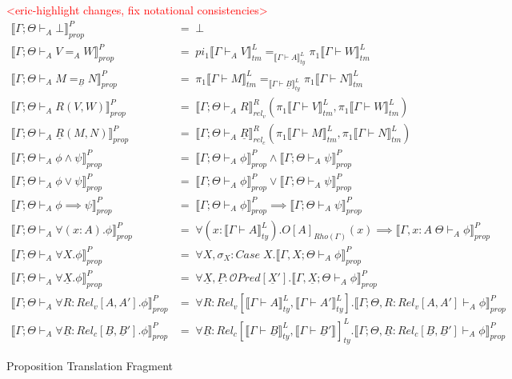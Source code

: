 \documentclass[acmsmall]{acmart}
\newcommand{\den}[1]{\llbracket #1\rrbracket}
\newcommand{\eric}[1]{\textcolor{red}{ <eric-#1> }}
\begin{document}
\begin{figure}
  \centering
  \scriptsize
  \eric{highlight changes, fix notational consistencies}
  \begin{align*}
    \den{\Gamma;\Theta\vdash_A \bot}^P_{prop}  &=\; \bot \\
    \den{\Gamma;\Theta\vdash_A V =_A W}^P_{prop} &=\; pi_1\den{\Gamma \vdash _AV}^L_{tm} =_{\den{\Gamma \vdash A}^L_{ty}} \pi_1 \den{\Gamma \vdash W}^L_{tm} \\
    \den{\Gamma;\Theta\vdash_A M =_{\underline{B}} N}^P_{prop} &=\;    \pi_1 \den{\Gamma \vdash M}^L_{tm} =_{\den{\Gamma \vdash \underline{B}}^L_{ty}}  \pi_1 \den{\Gamma  \vdash N}^L_{tm} \\
    \den{\Gamma;\Theta\vdash_A R(V,W)}^P_{prop} &=\;   \den{\Gamma ;\Theta\vdash _AR}^R_{rel_v}( \pi_1 \den{\Gamma \vdash V}^L_{tm},  \pi_1 \den{\Gamma \vdash W}^L_{tm}) \\
    \den{\Gamma;\Theta\vdash_A \underline{R}(M,N)}^P_{prop} &=\;   \den{\Gamma ; \Theta\vdash_A\underline{R}}^R_{rel_c}( \pi_1 \den{\Gamma \vdash M}^L_{tm},  \pi_1 \den{\Gamma \vdash N}^L_{tm}) \\
    \den{\Gamma;\Theta\vdash_A \phi \land \psi}^P_{prop} &=\;   \den{\Gamma;\Theta\vdash_A \phi}^P_{prop} \land \den{\Gamma;\Theta\vdash_A \psi}^P_{prop} \\
    \den{\Gamma;\Theta\vdash_A \phi \lor \psi}^P_{prop} &=\;   \den{\Gamma;\Theta\vdash_A \phi}^P_{prop} \lor \den{\Gamma;\Theta\vdash_A \psi}^P_{prop} \\
    \den{\Gamma;\Theta\vdash_A \phi \implies \psi}^P_{prop} &=\;   \den{\Gamma;\Theta\vdash_A \phi}^P_{prop} \implies \den{\Gamma;\Theta\vdash_A \psi}^P_{prop} \\
    \den{\Gamma;\Theta\vdash_A \forall(x:A).\phi}^P_{prop} &=\;   \forall(x:\den{\Gamma  \vdash A}^L_{ty}).O[A]_{Rho(\Gamma)}(x)\implies\den{\Gamma,x : A\;\Theta\vdash_A \phi}^P_{prop} \\
    \den{\Gamma;\Theta\vdash_A \forall X.\phi}^P_{prop} &=\;   \forall X,\sigma_X:Case\;X.\den{\Gamma,X;\Theta\vdash_A \phi}^P_{prop}\\
    \den{\Gamma;\Theta\vdash_A \forall \underline{X}.\phi}^P_{prop} &=\;   \forall \underline{X},\underline{P}:\mathcal{O}Pred[\underline{X}'].\den{\Gamma,\underline{X};\Theta\vdash_A \phi}^P_{prop} \\
    \den{\Gamma;\Theta\vdash_A \forall R:Rel_v[A,A'].\phi}^P_{prop} &=\;   \forall  R:Rel_v[\den{\Gamma \vdash A}^L_{ty},\den{\Gamma \vdash A'}^L_{ty}].\den{\Gamma;\Theta,R:Rel_v[A,A']\vdash_A \phi}^P_{prop}\\
    \den{\Gamma;\Theta\vdash_A \forall \underline{R}:Rel_c[\underline{B},\underline{B}'].\phi}^P_{prop} &=\;   \forall \underline{R}:Rel_c[\den{\Gamma \vdash \underline{B}}^L_{ty},\den{\Gamma \vdash \underline{B}'}]^L_{ty}.\den{\Gamma;\Theta,\underline{R}:Rel_c[\underline{B},\underline{B}']\vdash_A \phi}^P_{prop}
    \end{align*}
    \caption{Proposition Translation Fragment}
    \label{fig:PropTranslation}
\end{figure}
\end{document}
